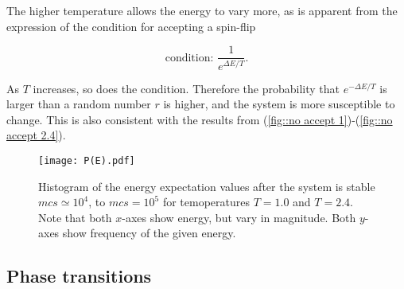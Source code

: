 \documentclass[11pt]{article}
\begin{document}
\begin{flushleft}
The higher temperature allows the energy to vary more, as is apparent from the expression of the condition for accepting a spin-flip

\begin{equation*}
\text{condition: } \frac{1}{e^{\Delta E/T}} .
\end{equation*}

As $T$ increases, so does the condition. Therefore the probability that $e^{-\Delta E/T}$ is larger than a random number $r$ is higher, and the system is more susceptible to change. This is also consistent with the results from (\ref{fig::no accept 1})-(\ref{fig::no accept 2.4}).


\begin{figure}[H]
\centering
\texttt{[image: P(E).pdf]}
\caption{Histogram of the energy expectation values after the system is stable $mcs \simeq 10^4$, to $mcs= 10^5$ for temoperatures $T=1.0$ and $T=2.4$. Note that both $x$-axes show energy, but vary in magnitude. Both $y$-axes show frequency of the given energy.}
\label{fig::P(E)}
\end{figure}


\end{flushleft}

\subsection*{Phase transitions}
\end{document}
